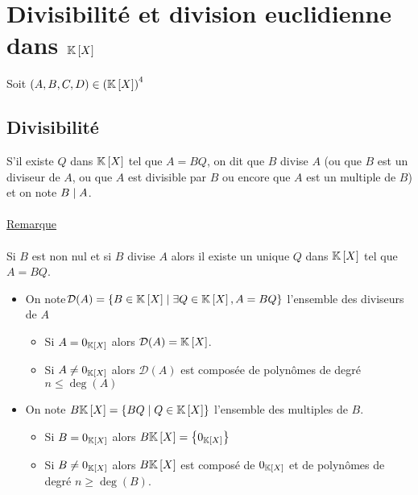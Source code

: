 \section{Divisibilité et division euclidienne dans \(\mathbb{K} \left[X\right]\)}
Soit \(\left(A,B,C,D\right) \in \left(\mathbb{K} \left[X\right]\right)^4\)
\subsection{Divisibilité}
\begin{defi}
    S’il existe \(Q\) dans \(\mathbb{K} \left[X\right]\) tel que \(A = BQ\), on dit que \(B\) divise \(A\) (ou que \(B\) est un diviseur de \(A\), ou que \(A\) est divisible par \(B\) ou encore que \(A\) est un multiple de \(B\)) et on note \(B\mid A\).\\~\\
    \underline{Remarque}\\~\\
    Si \(B\) est non nul et si \(B\) divise \(A\) alors il existe un unique \(Q\) dans \(\mathbb{K} \left[X\right]\) tel que \(A = BQ\).
\end{defi}

\begin{defprop}
    \begin{itemize}
        \item On note\( \mathcal{D}(A) = \left\lbrace B \in \mathbb{K} \left[X\right] \;\middle|\; \exists Q \in \mathbb{K} \left[X\right] , A = BQ\right\rbrace\) l’ensemble des diviseurs de \(A\)
        \begin{itemize}
            \item Si \(A = 0_{\mathbb{K}\left[X\right]}\) alors \(\mathcal{D}(A) = \mathbb{K} \left[X\right]\).
            \item Si \(A\neq 0_{\mathbb{K}\left[X\right]}\) alors \(\mathcal{D}(A)\) est composée de polynômes de degré \(n \leq \deg (A)\)
        \end{itemize}
        \item On note \(B\mathbb{K} \left[X\right] = \left\lbrace BQ \;\middle|\; Q \in \mathbb{K} \left[X\right]\right\rbrace\) l’ensemble des multiples de \(B\).
        \begin{itemize}
            \item Si \(B = 0_{\mathbb{K}\left[X\right]}\) alors \(B \mathbb{K} \left[X\right] = \left\lbrace0_{\mathbb{K}\left[X\right]}\right\rbrace\)
            \item Si \(B \neq 0_{\mathbb{K} \left[X\right]}\) alors  \(B \mathbb{K} \left[X\right]\) est composé de \(0_{\mathbb{K} \left[X\right]}\) et de polynômes de degré \(n \geq \deg(B)\).
        \end{itemize}
    \end{itemize}
\end{defprop}

